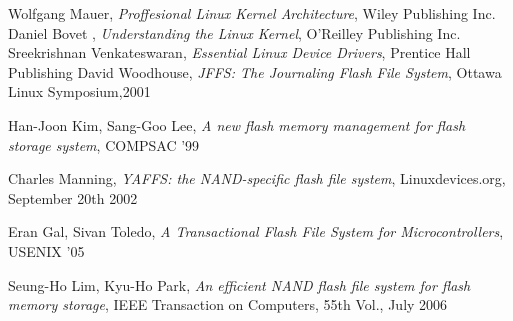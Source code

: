 \documentclass[conference]{IEEEtran}
\begin{document}















%
%
%
\begin{thebibliography}{1}
Wolfgang Mauer, \emph{Proffesional Linux Kernel Architecture},
Wiley Publishing Inc.
Daniel Bovet , \emph{Understanding the Linux Kernel},
O'Reilley Publishing Inc.
Sreekrishnan Venkateswaran, \emph{Essential Linux Device Drivers},
Prentice Hall Publishing
David Woodhouse, \emph{JFFS: The Journaling Flash File System},
Ottawa Linux Symposium,2001

Han-Joon Kim, Sang-Goo Lee, \emph{A new flash memory management
for flash storage system}, COMPSAC '99

Charles Manning, \emph{YAFFS: the NAND-specific flash file system},
Linuxdevices.org, September 20th 2002

Eran Gal, Sivan Toledo, \emph{A Transactional Flash File System for
Microcontrollers}, USENIX '05

Seung-Ho Lim, Kyu-Ho Park, \emph{An efficient NAND flash file
system for flash memory storage}, IEEE Transaction on Computers, 55th Vol.,
July 2006

\end{thebibliography}




\end{document}
